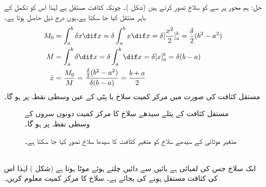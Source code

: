 حل:\quad
ہم محور  پر  سے   کو سلاخ تصور کرتے ہیں (شکل )۔ چونکہ کثافت مستقل ہے لہٰذا اس کو تکمل کے باہر منتقل کیا جا سکتا ہے۔یوں درج ذیل حاصل ہوتا ہے۔
\begin{align*}
M_0&=\int_a^b\delta x\dif x=\delta \int_a^bx\dif x=\delta[\frac{x^2}{2}]_a^b=\frac{\delta}{2}(b^2-a^2)\\
M&=\int_a^b\delta \dif x=\delta\int_a^b\dif x=\delta[x]_a^b=\delta(b-a)\\
\bar{x}&=\frac{M_0}{M}=\frac{\frac{\delta}{2}(b^2-a^2)}{\delta (b-a)}=\frac{b+a}{2}
\end{align*}
مستقل کثافت کی صورت میں مرکز کمیت سلاخ یا پٹی کے عین وسطی نقطہ پر ہو گا۔
\begin{figure}
\centering
\begin{minipage}{0.45\textwidth}
\centering
{}
\caption{مستقل کثافت کے پتلے سیدھے سلاخ کا مرکز کمیت دونوں سروں کے وسطی نقطہ پر ہو گا۔}
\label{شکل_تکمل_استعمال_پتلا_سلاخ}
\end{minipage}\hfill
\begin{minipage}{0.45\textwidth}
\centering
{}
\caption{متغیر موٹائی کے سیدھے سلاخ کو متغیر کثافت کا سیدھا سلاخ تصور کیا جا سکتا ہے۔}
\label{شکل_تکمل_استعمال_متغیر_پتلا_سلاخ}
\end{minipage}
\end{figure}
\\
ایک سلاخ جس کی لمبائی  ہے بائیں سے دائیں چلتے ہوئے موٹا ہوتا ہے (شکل ) لہٰذا اس کی کثافت مستقل ہونے کی بجائے  ہے۔ سلاخ کا مرکز کمیت معلوم کریں۔

